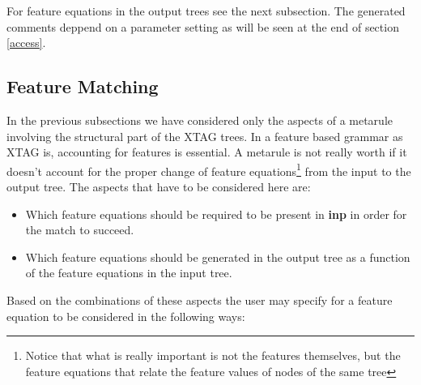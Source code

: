 For feature equations in the output trees see the next subsection. 
The generated comments deppend on a parameter setting as will be seen at the
end of section \ref{access}.

\subsection{Feature Matching}

In the previous subsections we have considered only the aspects of a metarule
involving the structural part of the XTAG trees. In a feature based grammar
as XTAG is, accounting for features is essential. A metarule is not really
worth if it doesn't account for the proper change of feature 
equations\footnote{Notice that what is really important is not the features
themselves, but the feature equations that relate the feature values of nodes
of the same tree} from the input to the output tree. 
The aspects that have to be considered here are:

\begin{itemize}
\item   Which feature equations should be required to be present in {\bf inp}
        in order for the match to succeed.

\item   Which feature equations should be generated in the output tree as a 
        function of the feature equations in the input tree.
\end{itemize}

Based on the combinations of these aspects the user may specify for a feature
equation to be considered in the following ways:

